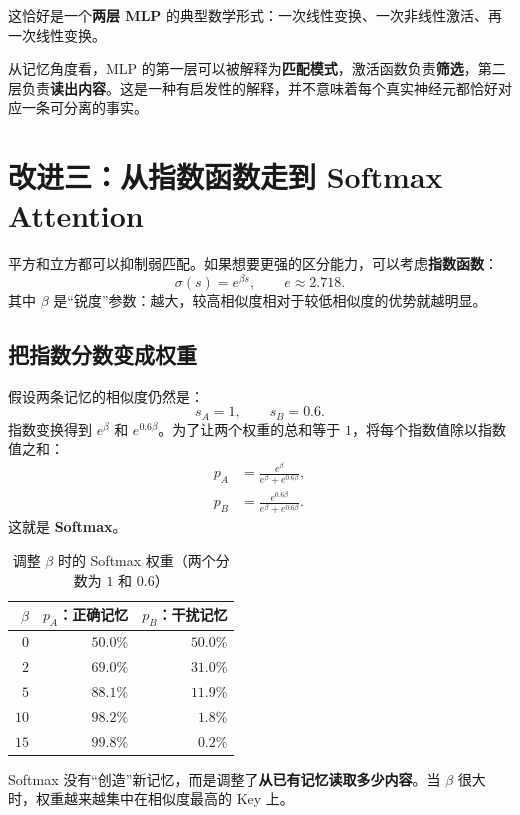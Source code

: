 \documentclass[11pt,a4paper,UTF8]{ctexart}
\numberwithin{equation}{section}
\begin{document}
这恰好是一个\textbf{两层 MLP} 的典型数学形式：一次线性变换、一次非线性激活、再一次线性变换。

\begin{conclusion}
从记忆角度看，MLP 的第一层可以被解释为\textbf{匹配模式}，激活函数负责\textbf{筛选}，第二层负责\textbf{读出内容}。这是一种有启发性的解释，并不意味着每个真实神经元都恰好对应一条可分离的事实。
\end{conclusion}

\section{改进三：从指数函数走到 Softmax Attention}

平方和立方都可以抑制弱匹配。如果想要更强的区分能力，可以考虑\textbf{指数函数}：
\begin{equation}
\sigma(s)=e^{\beta s},\qquad e\approx2.718.
\end{equation}
其中 $\beta$ 是“锐度”参数：越大，较高相似度相对于较低相似度的优势就越明显。

\subsection{把指数分数变成权重}
假设两条记忆的相似度仍然是：
\[
s_A=1,\qquad s_B=0.6.
\]
指数变换得到 $e^{\beta}$ 和 $e^{0.6\beta}$。为了让两个权重的总和等于 $1$，将每个指数值除以指数值之和：
\begin{align}
p_A&=\frac{e^{\beta}}{e^{\beta}+e^{0.6\beta}},\\
p_B&=\frac{e^{0.6\beta}}{e^{\beta}+e^{0.6\beta}}.
\end{align}
这就是 \textbf{Softmax}。

\begin{table}[H]
\centering
\caption{调整 $\beta$ 时的 Softmax 权重（两个分数为 $1$ 和 $0.6$）}
\begin{tabular}{@{}rrr@{}}
\toprule
$\beta$ & $p_A$：正确记忆 & $p_B$：干扰记忆\\
\midrule
$0$ & $50.0\%$ & $50.0\%$\\
$2$ & $69.0\%$ & $31.0\%$\\
$5$ & $88.1\%$ & $11.9\%$\\
$10$ & $98.2\%$ & $1.8\%$\\
$15$ & $99.8\%$ & $0.2\%$\\
\bottomrule
\end{tabular}
\end{table}

\begin{idea}
Softmax 没有“创造”新记忆，而是调整了\textbf{从已有记忆读取多少内容}。当 $\beta$ 很大时，权重越来越集中在相似度最高的 Key 上。
\end{idea}
\end{document}
